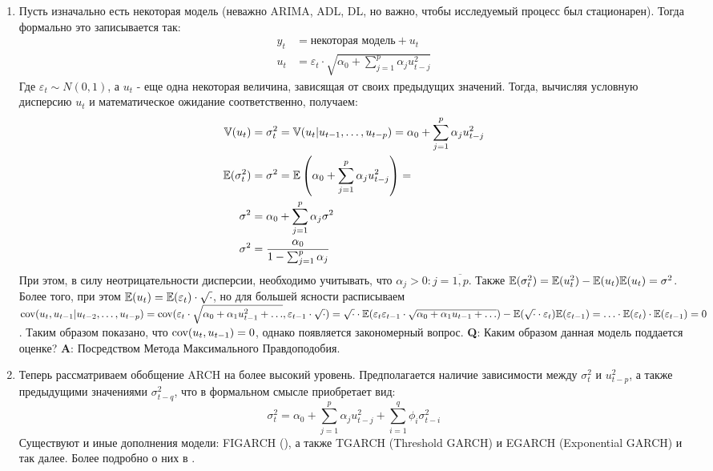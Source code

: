 \begin{enumerate}
	\item Пусть изначально есть некоторая модель (неважно ARIMA, ADL, DL, но важно, чтобы исследуемый процесс был стационарен). Тогда формально это записывается так:
	\begin{equation}
		\begin{split}
			y_t & = \text{некоторая модель} + u_t\\
			u_t & = \varepsilon_t \cdot \sqrt{\alpha_0 + \sum_{j = 1}^p \alpha_j u_{t - j}^2}
		\end{split}
	\end{equation}
	Где $\varepsilon_t \sim N(0, 1)$, а $u_t$ - еще одна некоторая величина, зависящая от своих предыдущих значений. Тогда, вычисляя условную дисперсию $u_t$ и математическое ожидание соответственно,  получаем:
	\begin{equation}
		\begin{split}
			\mathbb{V}(u_t) & = \sigma^2_t  = \mathbb{V}(u_t \vert u_{t - 1}, \ldots, u_{t - p}) = \alpha_0 + \sum_{j = 1}^p \alpha_j u_{t - j}^2\\
			\mathbb{E}(\sigma^2_t) & = \sigma^2 = \mathbb{E}\left(\alpha_0 + \sum_{j = 1}^p \alpha_j u_{t - j}^2\right) = \\
			\sigma^2 & = \alpha_0 + \sum_{j = 1}^p \alpha_j \sigma^2\\
			\sigma^2 & = \frac{\alpha_0}{1 - \sum_{j = 1}^p \alpha_j}
		\end{split}
	\end{equation}
	При этом, в силу неотрицательности дисперсии, необходимо учитывать, что $\alpha_j > 0: j = \overline{1,p}$. Также $\mathbb{E}(\sigma^2_t) = \mathbb{E}(u^2_t) - \mathbb{E}(u_t)\mathbb{E}(u_t) = \sigma^2$. Более того, при этом $\mathbb{E}(u_t) = \mathbb{E}(\varepsilon_t) \cdot \sqrt{\cdot}$, но для большей ясности расписываем $\text{cov}(u_{t}, u_{t - 1} \vert u_{t - 2}, \ldots, u_{t - p}) = \text{cov}(\varepsilon_{t} \cdot \sqrt{\alpha_0 + \alpha_1 u_{t - 1}^2 + \ldots}, \varepsilon_{t - 1} \cdot \sqrt{\cdot}) = \sqrt{\cdot} \cdot \mathbb{E}(\varepsilon_{t}\varepsilon_{t - 1} \cdot \sqrt{\alpha_0 + \alpha_1 u_{t - 1} + \ldots}) - \mathbb{E}(\sqrt{\cdot} \cdot \varepsilon_{t}) \mathbb{E}(\varepsilon_{t - 1}) = \ldots \cdot \mathbb{E}(\varepsilon_{t}) \cdot \mathbb{E}(\varepsilon_{t - 1}) = 0$. Таким образом показано, что $\text{cov}(u_{t}, u_{t - 1}) = 0$, однако появляется закономерный вопрос. \textbf{Q}: Каким образом данная модель поддается оценке? \textbf{A}: Посредством Метода Максимального Правдоподобия.
	
	\item Теперь рассматриваем обобщение ARCH на более высокий уровень. Предполагается наличие зависимости между $\sigma^2_t$ и $u^2_{t - p}$, а также предыдущими значениями $\sigma^2_{t - q}$, что в формальном смысле приобретает вид:
	\begin{equation}
		\sigma^2_t = \alpha_0 + \sum_{j = 1}^p \alpha_j u_{t - j}^2 + \sum_{i = 1}^q \phi_i \sigma^2_{t - i}
	\end{equation}
	Существуют и иные дополнения модели: FIGARCH (), а также TGARCH (Threshold GARCH) и EGARCH (Exponential GARCH) и так далее. Более подробно о них в \cite{verbik_econometrics_garchs}.
\end{enumerate}
